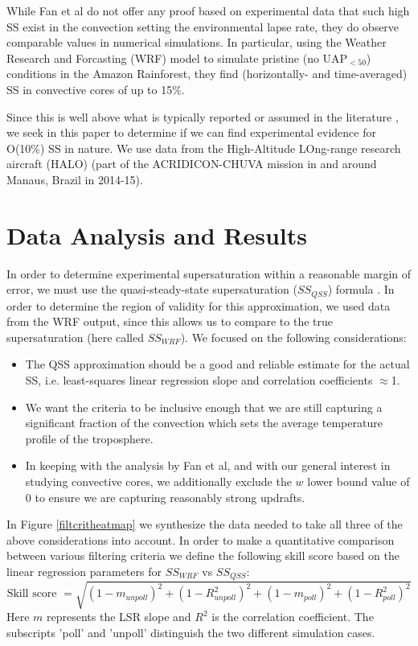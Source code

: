 \documentclass{article}
\begin{document}
While Fan et al do not offer any proof based on experimental data that such high SS exist in the convection setting the environmental lapse rate, they do observe comparable values in numerical simulations. In particular, using the Weather Research and Forcasting (WRF) model to simulate pristine (no UAP$_{<50}$) conditions in the Amazon Rainforest, they find (horizontally- and time-averaged) SS in convective cores of up to 15\%.

Since this is well above what is typically reported or assumed in the literature \cite{Hoppel1996, Yang2019, Koike2012, Politovich1988, Moteki2019, Siebert2017, Shen2018, Hammer2014, Li2019}, we seek in this paper to determine if we can find experimental evidence for O(10\%) SS in nature. We use data from the High-Altitude LOng-range research aircraft (HALO) (part of the ACRIDICON-CHUVA mission in and around Manaus, Brazil in 2014-15).

\section{Data Analysis and Results}

In order to determine experimental supersaturation within a reasonable margin of error, we must use the quasi-steady-state supersaturation ($SS_{QSS}$) formula \cite{Rogers1989}. In order to determine the region of validity for this approximation, we used data from the WRF output, since this allows us to compare to the true supersaturation (here called $SS_{WRF}$). We focused on the following considerations:
\begin{itemize}
\item The QSS approximation should be a good and reliable estimate for the actual SS, i.e. least-squares linear regression slope and correlation coefficients $\approx$1.  
\item We want the criteria to be inclusive enough that we are still capturing a significant fraction of the convection which sets the average temperature profile of the troposphere.
\item In keeping with the analysis by Fan et al, and with our general interest in studying convective cores, we additionally exclude the $w$ lower bound value of 0 to ensure we are capturing reasonably strong updrafts. 
\end{itemize}
In Figure \ref{filtcritheatmap} we synthesize the data needed to take all three of the above considerations into account. In order to make a quantitative comparison between various filtering criteria we define the following skill score based on the linear regression parameters for $SS_{WRF}$ vs $SS_{QSS}$:
\begin{equation}
\text{Skill score } = \sqrt{(1-m_{unpoll})^2 + (1-R_{unpoll}^2)^2 + (1-m_{poll})^2 + (1-R_{poll}^2)^2}
\end{equation}
Here $m$ represents the LSR slope and $R^2$ is the correlation coefficient. The subscripts 'poll' and 'unpoll' distinguish the two different simulation cases.
\end{document}
